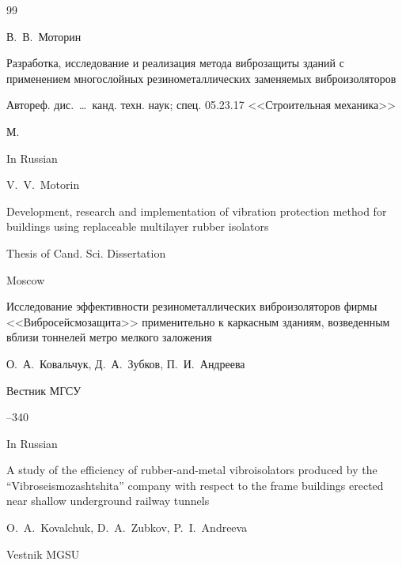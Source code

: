 \begin{thebibliography}{99}

\by В.~В.~Моторин

\thesis Разработка, исследование и реализация метода виброзащиты зданий с применением многослойных резинометаллических заменяемых виброизоляторов

\thesisinfo Автореф. дис.~\dots\ канд. техн. наук; спец. 05.23.17 <<Строительная механика>>

\publaddr М.



\misctransl

\lang In Russian

\by V.~V.~Motorin

\thesis Development, research and implementation of vibration protection method for buildings using replaceable multilayer rubber isolators

\thesisinfo Thesis of Cand. Sci. Dissertation

\publaddr Moscow








\paper Исследование эффективности резинометаллических виброизоляторов фирмы <<Вибросейсмозащита>> применительно к каркасным зданиям, возведенным вблизи тоннелей метро мелкого заложения

\by О.~А.~Ковальчук, Д.~А.~Зубков, П.~И.~Андреева

\jour Вестник МГСУ



--340


\misctransl

\lang In Russian

\paper A study of the efficiency of rubber-and-metal vibroisolators produced by the ``Vibroseismozashtshita'' company with respect to the frame buildings erected near shallow underground railway tunnels

\by O.~A.~Kovalchuk, D.~A.~Zubkov, P.~I.~Andreeva

\jour  Vestnik MGSU




\end{thebibliography}
